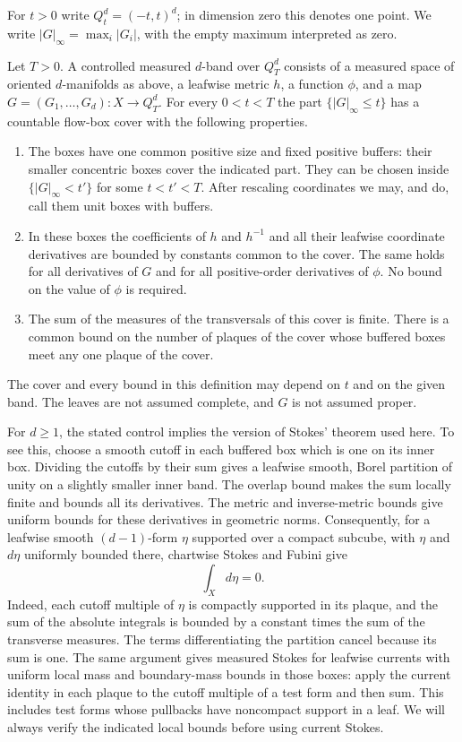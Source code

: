 For $t>0$ write $Q_t^d=(-t,t)^d$; in dimension zero this denotes one point.
We write $|G|_\infty=\max_i|G_i|$, with the empty maximum interpreted as
zero.

\begin{definition}\label{def:degree-band}
Let $T>0$.  A controlled measured $d$-band over $Q_T^d$ consists of a
measured space of oriented $d$-manifolds as above, a leafwise metric $h$,
a function $\phi$, and a map $G=(G_1,\ldots,G_d):X\to Q_T^d$.
For every $0<t<T$ the part $\{|G|_\infty\le t\}$ has a countable flow-box
cover with the following properties.
\begin{enumerate}
\item The boxes have one common positive size and fixed positive buffers:
their smaller concentric boxes cover the indicated part.  They can be
chosen inside $\{|G|_\infty<t'\}$ for some $t<t'<T$.  After rescaling
coordinates we may, and do, call them unit boxes with buffers.
\item In these boxes the coefficients of $h$ and $h^{-1}$ and all their
leafwise coordinate derivatives are bounded by constants common to the
cover.  The same holds for all derivatives of $G$ and for all
positive-order derivatives of $\phi$.  No bound on the value of $\phi$ is
required.
\item The sum of the measures of the transversals of this cover is finite.
There is a common bound on the number of plaques of the cover whose
buffered boxes meet any one plaque of the cover.
\end{enumerate}
The cover and every bound in this definition may depend on $t$ and on the
given band.  The leaves are not assumed complete, and $G$ is not assumed
proper.
\end{definition}

For $d\ge1$, the stated control implies the version of Stokes' theorem used here.  To
see this, choose a smooth cutoff in each buffered box which is one on its
inner box.  Dividing the cutoffs by their sum gives a leafwise smooth,
Borel partition of unity on a slightly smaller inner band.  The overlap
bound makes the sum locally finite and bounds all its derivatives.  The
metric and inverse-metric bounds give uniform bounds for these derivatives
in geometric norms.  Consequently, for a leafwise smooth $(d-1)$-form
$\eta$ supported over a compact subcube, with $\eta$ and $d\eta$ uniformly
bounded there, chartwise Stokes and Fubini give
\begin{equation}\label{eq:degree-stokes}
                  \int_X d\eta=0.
\end{equation}
Indeed, each cutoff multiple of $\eta$ is compactly supported in its
plaque, and the sum of the absolute integrals is bounded by a constant
times the sum of the transverse measures.  The terms differentiating the
partition cancel because its sum is one.  The same argument gives measured
Stokes for leafwise currents with uniform local mass and boundary-mass
bounds in those boxes: apply the current identity in each plaque to the
cutoff multiple of a test form and then sum.  This includes test forms
whose pullbacks have noncompact support in a leaf.  We will always verify
the indicated local bounds before using current Stokes.

